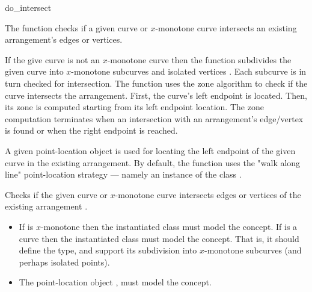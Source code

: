 \ccRefPageBegin

\begin{ccRefFunction}{do_intersect}

\ccDefinition

The function \ccRefName{} checks if a given curve or $x$-monotone
curve intersects an existing arrangement's edges or vertices. 

If the give curve is not an $x$-monotone curve then the function
subdivides the given curve into $x$-monotone subcurves and isolated
vertices . Each subcurve is in turn checked for intersection.
The function uses the zone algorithm to check if the curve intersects
the arrangement. First, the curve's left endpoint is located. Then, 
its zone is computed starting from its left endpoint location. The
zone computation terminates when an intersection with an arrangement's
edge/vertex is found or when the right endpoint is reached. 

A given point-location object is used for locating the left endpoint 
of the given curve in the existing arrangement. By default, the function 
uses the "walk along line" point-location strategy --- namely an 
instance of the class 
.



Checks if the given curve or $x$-monotone curve  intersects
  edges or vertices of the existing arrangement .


\ccRequirements
\begin{itemize}
\item If  is $x$-monotone then the instantiated 
  class must model the   concept. If
   is a curve then the instantiated  class must
  model the  concept. That is, it should
  define the  type, and support its subdivision into
  $x$-monotone subcurves (and perhaps isolated points).
\item The point-location object , must model the
   concept.
\end{itemize}

\end{ccRefFunction}

\ccRefPageEnd
